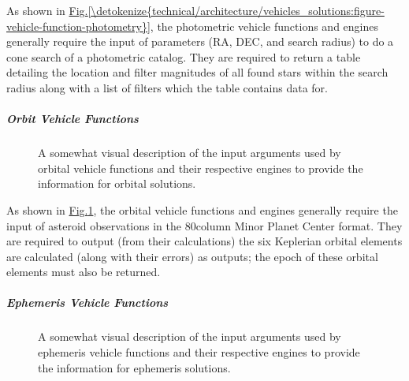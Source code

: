 \documentclass[letterpaper,11pt,english]{sphinxmanual}
\begin{document}
\sphinxAtStartPar
As shown in \hyperref[\detokenize{technical/architecture/vehicles_solutions:figure-vehicle-function-photometry}]{Fig.\@ \ref{\detokenize{technical/architecture/vehicles_solutions:figure-vehicle-function-photometry}}}, the photometric
vehicle functions and engines generally require the input of parameters (RA,
DEC, and search radius) to do a cone search of a photometric catalog. They are
required to return a table detailing the location and filter magnitudes of all
found stars within the search radius along with a list of filters which the
table contains data for.


\subparagraph{Orbit Vehicle Functions}
\label{\detokenize{technical/architecture/vehicles_solutions:orbit-vehicle-functions}}
\begin{figure}[H]
\centering
\capstart

\noindent{}
\caption{A somewhat visual description of the input arguments used by
orbital vehicle functions and their respective engines to
provide the information for orbital solutions.}\label{\detokenize{technical/architecture/vehicles_solutions:id3}}\label{\detokenize{technical/architecture/vehicles_solutions:figure-vehicle-function-orbit}}\end{figure}

\sphinxAtStartPar
As shown in \hyperref[\detokenize{technical/architecture/vehicles_solutions:figure-vehicle-function-orbit}]{Fig.\@ \ref{\detokenize{technical/architecture/vehicles_solutions:figure-vehicle-function-orbit}}}, the orbital vehicle
functions and engines generally require the input of asteroid observations
in the 80\sphinxhyphen{}column Minor Planet Center format. They are required to output
(from their calculations) the six Keplerian orbital elements are calculated
(along with their errors) as outputs; the epoch of these orbital elements
must also be returned.


\subparagraph{Ephemeris Vehicle Functions}
\label{\detokenize{technical/architecture/vehicles_solutions:ephemeris-vehicle-functions}}
\begin{figure}[H]
\centering
\capstart

\noindent{}
\caption{A somewhat visual description of the input arguments used by
ephemeris vehicle functions and their respective engines to
provide the information for ephemeris solutions.}\label{\detokenize{technical/architecture/vehicles_solutions:id4}}\label{\detokenize{technical/architecture/vehicles_solutions:figure-vehicle-function-ephemeris}}\end{figure}
\end{document}
